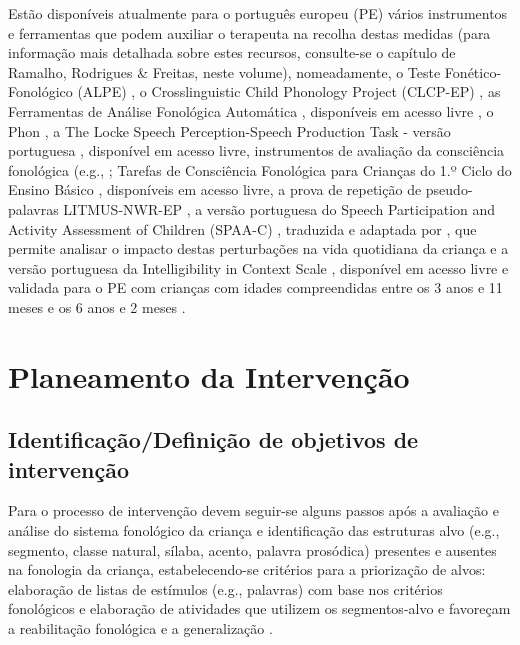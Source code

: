 \documentclass[output=paper,colorlinks,citecolor=brown,booklanguage=portuguese]{langscibook}
\begin{document}
Estão disponíveis atualmente para o português europeu (PE) vários instrumentos e ferramentas que podem auxiliar o terapeuta na recolha destas medidas (para informação mais detalhada sobre estes recursos, consulte-se o capítulo de Ramalho, Rodrigues \& Freitas, neste volume), nomeadamente, o Teste Fonético-Fonológico (ALPE) \citep{Mendes2013, Lousada2012}, o Crosslinguistic Child Phonology Project (CLCP-EP) \citep{Ramalho2014}, as Ferramentas de Análise Fonológica Automática \citep{Saraiva2017}, disponíveis em acesso livre \citep{Jesus2013}, o Phon \citep{Rose2014, Rose2006, Hedlund2019}, a The Locke Speech Perception-Speech Production Task - versão portuguesa \citep{Lousada2016}, disponível em acesso livre, instrumentos de avaliação da consciência fonológica (e.g., ; Tarefas de Consciência Fonológica para Crianças do 1.º Ciclo do Ensino Básico \citep{Afonso2015}, disponíveis em acesso livre, a prova de repetição de pseudo-palavras LITMUS-NWR-EP \citep{Almeida2015}, a versão portuguesa do Speech Participation and Activity Assessment of Children (SPAA-C) \citep{McLeod2004}, traduzida e adaptada por \citet{Ramos2017}, que permite analisar o impacto destas perturbações na vida quotidiana da criança e a versão portuguesa da Intelligibility in Context Scale \citep{McLeod2012}, disponível em acesso livre e validada para o PE com crianças com idades compreendidas entre os 3 anos e 11 meses e os 6 anos e 2 meses \citep{Lousada2019}.

\section{Planeamento da Intervenção}\label{sec:cap7sec3}
\subsection{Identificação/Definição de objetivos de intervenção}
Para o processo de intervenção devem seguir-se alguns passos após a avaliação e análise do sistema fonológico da criança e identificação das estruturas alvo (e.g., segmento, classe natural, sílaba, acento, palavra prosódica) presentes e ausentes na fonologia da criança, estabelecendo-se critérios para a priorização de alvos: elaboração de listas de estímulos (e.g., palavras) com base nos critérios fonológicos e elaboração de atividades que utilizem os segmentos-alvo e favoreçam a reabilitação fonológica e a generalização \citep{Lowe1996, Bernhardt2000}.
\end{document}

